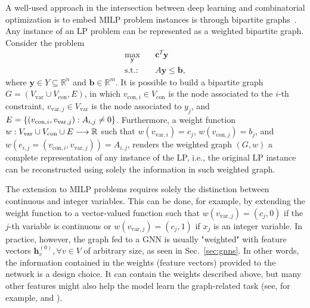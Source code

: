 A well-used approach in the intersection between deep learning and combinatorial optimization is to embed MILP problem instances is through bipartite graphs~\cite{gasseExactCombinatorialOptimization2019,nairSolvingMixedInteger2021,dingAcceleratingPrimalSolution2020,khalilMIPGNNDataDrivenFramework2022,hanGNNGuidedPredictandSearchFramework2023}.
Any instance of an LP problem can be represented as a weighted bipartite graph.
Consider the problem
\begin{equation}\label{eq:example-lp-graph}
\begin{aligned}
    \max_{\bm{y}} & \quad \bm{c}^T \bm{y} \\
    \text{s.t.:} & \quad A\bm{y} \le\bm{b} 
,\end{aligned}
\end{equation}
where $\bm{y}\in Y \subseteq\mathbb{R}^n$ and $\bm{b}\in \mathbb{R}^m$.
It is possible to build a bipartite graph $G=(V_{\textrm{var}}\cup V_{\textrm{con}}, E)$, in which $v_{\textrm{con},i}\in V_{\textrm{con}}$ is the node associated to the $i$-th constraint, $v_{\textrm{var},j}\in V_{\textrm{var}}$ is the node associated to $y_j$, and $E=\{(v_{{\rm con},i},v_{{\rm var},j}) : A_{i,j} \neq 0\}$.
Furthermore, a weight function $w: V_{\textrm{var}}\cup V_\textrm{con}\cup E \longrightarrow \mathbb{R}$ such that $w(v_{\textrm{var},i}) = c_j$, $w(v_{\textrm{con},j}) = b_j$, and $w(e_{i,j}=(v_{\textrm{con},i},v_{\textrm{var},j})) = A_{i,j}$, renders the weighted graph $(G,w)$ a complete representation of any instance of the LP, i.e., the original LP instance can be reconstructed using solely the information in such weighted graph.

The extension to MILP problems requires solely the distinction between continuous and integer variables.
This can be done, for example, by extending the weight function to a vector-valued function such that $w(v_{\textrm{var},j}) = (c_j,0)$ if the $j$-th variable is continuous or $w(v_{\textrm{var},j}) = (c_j,1)$ if $x_j$ is an integer variable.
In practice, however, the graph fed to a GNN is usually "weighted" with feature vectors $\bm{h}_v^{(0)}, \forall v\in V$ of arbitrary size, as seen in Sec.~\ref{sec:gnns}.
In other words, the information contained in the weights (feature vectors) provided to the network is a design choice.
It can contain the weights described above, but many other features might also help the model learn the graph-related task (see, for example,  and ).

